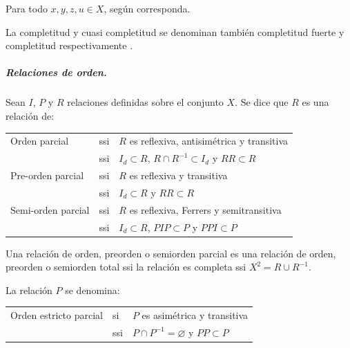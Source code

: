 \documentclass[a5paper,doc,10pt,noapacite]{apa6}
\begin{document}
{{Para todo \(x,y,z,u \in X\), según corresponda.

La completitud y cuasi completitud se denominan también completitud fuerte y completitud
respectivamente .

\newpage

\subparagraph{Relaciones de orden.}

Sean \(I\), \(P\) y \(R\) relaciones definidas sobre el conjunto \(X\). Se dice que \(R\) es una relación de:

\begin{table}[H]
\fontsize{8}{11}\selectfont
\begin{center}
\begin{tabular}{l l l }
	Orden parcial      & ssi & \(R\) es reflexiva, antisimétrica y transitiva  \\
	                   & ssi & \(I_d \subset R\), \( R \cap R^{-1} \subset I_d \) y \(RR \subset R \)\\
    Pre-orden parcial  & ssi & \(R\) es reflexiva y transitiva \\
                       & ssi & \(I_d \subset R\) y \(RR \subset R \)\\
    Semi-orden parcial & ssi & \(R\) es reflexiva, Ferrers y semitransitiva \\
                       & ssi & \(I_d \subset R\), \(PIP \subset P\) y \(PPI \subset P \)\\[-1\baselineskip]
\end{tabular}
\label{tab:B8} 
\end{center}
\end{table}

\vspace{-1\baselineskip}

Una relación de orden, preorden o semiorden parcial es una relación de orden, preorden o semiorden total ssi la relación es completa ssi \(X^2 = R \cup R^{-1}\).

La relación \(P\) se denomina:

\begin{table}[H]
\fontsize{7.5}{11}\selectfont
\begin{center}
	\begin{tabular}{l l l }
		Orden estricto parcial & si & \(P\) es asimétrica y transitiva \\
	    	                   & ssi & \(P \cap P^{-1} = \varnothing \) y \(PP \subset P \)\\[-1\baselineskip]
	\end{tabular}
	\label{tab:B9} 
\end{center}
\end{table}

}}
\end{document}
